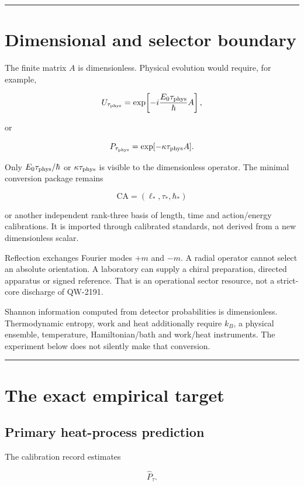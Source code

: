 \documentclass[11pt,a4paper,openany]{report}
\begin{document}
\par\medskip\hrule\medskip

\chapter{Dimensional and selector boundary}

The finite matrix \(A\) is dimensionless. Physical evolution would require, for example,

\[
U_{\tau_{\rm phys}}
=
\exp\!\left[-i\frac{E_0\tau_{\rm phys}}{\hbar}A\right],
\]

or

\[
P_{\tau_{\rm phys}}
=
\exp[-\kappa\tau_{\rm phys}A].
\]

Only \(E_0\tau_{\rm phys}/\hbar\) or \(\kappa\tau_{\rm phys}\) is visible to the dimensionless operator. The minimal conversion package remains

\[
\mathrm{CA}=(\ell_*,\tau_*,\hbar_*)
\]

or another independent rank-three basis of length, time and action/\allowbreak{}energy calibrations. It is imported through calibrated standards, not derived from a new dimensionless scalar.

Reflection exchanges Fourier modes \(+m\) and \(-m\). A radial operator cannot select an absolute orientation. A laboratory can supply a chiral preparation, directed apparatus or signed reference. That is an operational sector resource, not a strict-core discharge of QW-2191.

Shannon information computed from detector probabilities is dimensionless. Thermodynamic entropy, work and heat additionally require \(k_B\), a physical ensemble, temperature, Hamiltonian/\allowbreak{}bath and work/\allowbreak{}heat instruments. The experiment below does not silently make that conversion.

\par\medskip\hrule\medskip

\chapter{The exact empirical target}

\section{Primary heat-process prediction}

The calibration record estimates

\[
\widehat P_\tau.
\]
\end{document}
